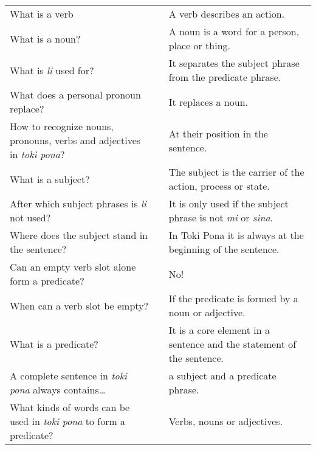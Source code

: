 \begin{supertabular}{p{5,5cm}|ll}
    What is a verb                                                                &  & A verb describes an action.                                                \\
    What is a noun?                                                               &  & A noun is a word for a person, place or thing.                             \\
    What is \textit{li} used for?                                                 &  & It separates the subject phrase from the predicate phrase.                 \\
    What does a personal pronoun replace?                                         &  & It replaces a noun.                                                        \\
    How to recognize nouns, pronouns, verbs and adjectives in \textit{toki pona}? &  & At their position in the sentence.                                         \\
    What is a subject?                                                            &  & The subject is the carrier of the action, process or state.                \\
    After which subject phrases is \textit{li} not used?                          &  & It is only used if the subject phrase is not \textit{mi} or \textit{sina}. \\
    Where does the subject stand in the sentence?                                 &  & In Toki Pona it is always at the beginning of the sentence.                \\
    Can an empty verb slot alone form a predicate?                                &  & No!                                                                        \\
    When can a verb slot be empty?                                                &  & If the predicate is formed by a noun or adjective.                         \\
    What is a predicate?                                                          &  & It is a core element in a sentence and the statement of the sentence.      \\
    A complete sentence in \textit{toki pona} always contains\dots                &  & a subject and a predicate phrase.                                          \\
    What kinds of words can be used in \textit{toki pona} to form a predicate?    &  & Verbs, nouns or adjectives.                                                \\

\end{supertabular}
